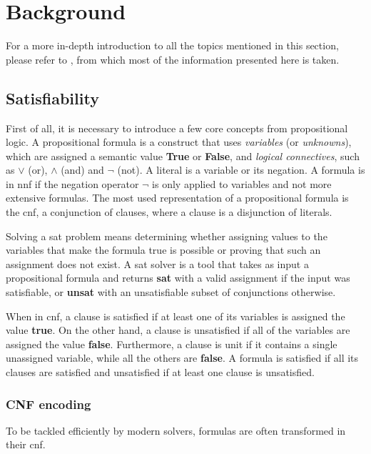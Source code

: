 \chapter{Background}

For a more in-depth introduction to all the topics mentioned in this section, please refer to \cite{book:handbook-sat,paper:survey-smt,book:lp}, from which most of the information presented here is taken.

\section{Satisfiability}

First of all, it is necessary to introduce a few core concepts from propositional logic.
A propositional formula is a construct that uses \textit{variables} (or \textit{unknowns}), which are assigned a semantic value \textbf{True} or \textbf{False}, and \textit{logical connectives}, such as $\lor$ (or), $\land$ (and) and $\neg$ (not).
A literal is a variable or its negation.
A formula is in \gls{nnf} if the negation operator $\neg$ is only applied to variables and not more extensive formulas.
The most used representation of a propositional formula is the \gls{cnf}, a conjunction of clauses, where a clause is a disjunction of literals.

Solving a \gls{sat} problem means determining whether assigning values to the variables that make the formula true is possible or proving that such an assignment does not exist.
A \gls{sat} solver is a tool that takes as input a propositional formula and returns \textbf{sat} with a valid assignment if the input was satisfiable, or \textbf{unsat} with an unsatisfiable subset of conjunctions otherwise.

When in \gls{cnf}, a clause is satisfied if at least one of its variables is assigned the value \textbf{true}.
On the other hand, a clause is unsatisfied if all of the variables are assigned the value \textbf{false}.
Furthermore, a clause is unit if it contains a single unassigned variable, while all the others are \textbf{false}.
A formula is satisfied if all its clauses are satisfied and unsatisfied if at least one clause is unsatisfied.

\subsection*{CNF encoding}

To be tackled efficiently by modern solvers, formulas are often transformed in their \gls{cnf}.

